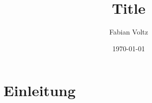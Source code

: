 \documentclass[a4paper,10pt,unnumberedsections,twoside]{LTJournalArticle}
\title{Title}
\author{Fabian Voltz}
\date{\today}
\begin{document}
\maketitle

\section{Einleitung}



\end{document}
